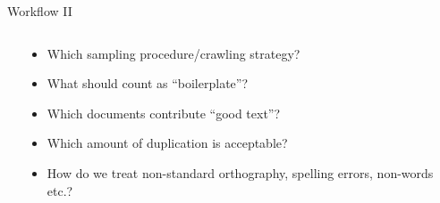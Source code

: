 \begin{frame}{Workflow II}
  \begin{columns}
    \begin{column}{5cm}
    \end{column}

    \begin{column}{5cm}
      \begin{itemize}
      \item Which sampling procedure/crawling strategy?
      \item<2-> What should count as ``boilerplate''?
      \item<3-> Which documents contribute ``good text''?
      \item<4-> Which amount of duplication is acceptable?
      \item<5-> How do we treat non-standard orthography, spelling errors, non-words etc.?
      \end{itemize}
    \end{column}
  \end{columns}
\end{frame}



